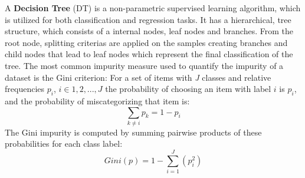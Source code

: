 A \textbf{Decision Tree} (DT) is a non-parametric supervised learning algorithm, which is utilized for both classification and regression tasks. 
It has a hierarchical, tree structure, which consists of a internal nodes, leaf nodes and branches.
From the root node, splitting criterias are applied on the samples creating branches and child nodes that lead to leaf nodes which represent the final classification of the tree.
The most common impurity measure used to quantify the impurity of a dataset is the Gini criterion:
For a set of items with \textit{J} classes and relative frequencies $p_{i}$, $i \in {1,2,...,J}$ 
the probability of choosing an item with label $i$ is $p_{i}$, and the probability of miscategorizing that item is:
\begin{equation} 
  \sum_{k \ne i} p_{k} = 1 - p_{i} 
\end{equation}
The Gini impurity is computed by summing pairwise products of these probabilities for each class label:
\begin{equation}
  Gini(p) = 1 - \sum_{i=1}^{J} (p_i^2)
\end{equation}


